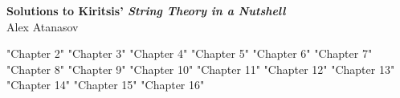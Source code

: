 \documentclass[11pt]{article}
\begin{document}
	\begin{center}
		\Large \textbf{Solutions to Kiritsis' \emph{String Theory in a Nutshell}}\\
		Alex Atanasov
	\end{center}
	
	{"Chapter 2"}
	\newpage 
	{"Chapter 3"}
	\newpage 
	{"Chapter 4"}
	\newpage 
	{"Chapter 5"}
	\newpage 
	{"Chapter 6"}
	\newpage 
	{"Chapter 7"}
	\newpage 
	{"Chapter 8"}
	\newpage 
	{"Chapter 9"}
	\newpage 
	{"Chapter 10"}
	\newpage 
	{"Chapter 11"}
	\newpage
	{"Chapter 12"}
	\newpage
	{"Chapter 13"}
	\newpage
	{"Chapter 14"}
	\newpage
	{"Chapter 15"}
	\newpage
	{"Chapter 16"}
\end{document}
